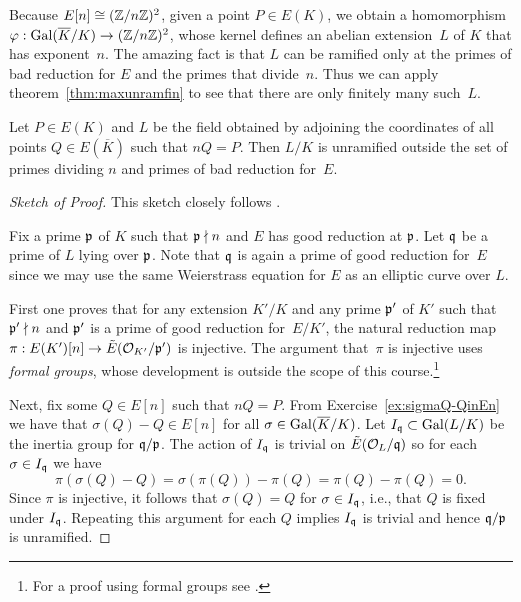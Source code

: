 Because $E[n] \cong (\mathbb{Z}/n\mathbb{Z})^2$, 
given a point $P\in E(K)$, we obtain a homomorphism
$\varphi: \operatorname{Gal}(\overline{K}/K) \to (\mathbb{Z}/n\mathbb{Z})^2$, whose kernel defines an
abelian extension~$L$ of $K$ that has exponent~$n$.
The amazing fact is that $L$ can be ramified only at the primes
of bad reduction for $E$ and the primes that divide~$n$.
Thus we can apply theorem~\ref{thm:maxunramfin} to see that there are
only finitely many such~$L$.

\begin{theorem}\label{thm:mwunram}
  Let $P\in E(K)$ and $L$ be the field obtained by adjoining the
  coordinates of all points $Q \in E(\overline{K})$ such that $nQ = P$.
  Then $L/K$ is unramified outside the set of primes
  dividing $n$ and primes of bad reduction for~$E$.
\end{theorem}
\begin{proof}[Sketch of Proof]
  This sketch closely follows \cite[Prop.~VIII.1.5b]{silverman:aec}.

  Fix a prime $\mathfrak{p}$ of $K$ such that $\mathfrak{p} \nmid n$ and $E$ has good
  reduction at $\mathfrak{p}$. Let $\mathfrak{q}$ be a prime of $L$ lying over $\mathfrak{p}$.
  Note that $\mathfrak{q}$ is again a prime of good reduction for~$E$
  since we may use the same Weierstrass equation for $E$ as an
  elliptic curve over $L$.

  First one proves that for any extension $K'/K$ and any prime $\mathfrak{p}'$ of $K'$
  such that $\mathfrak{p}' \nmid n$ and $\mathfrak{p}'$ is a prime of good reduction for~$E/K'$,
  the natural reduction map $\pi: E(K')[n] \to \tilde{E}(\mathcal{O}_{K'}/\mathfrak{p}')$
  is injective. The argument that~$\pi$ is injective uses
  \emph{formal groups}, whose development is outside the
  scope of this course.\footnote{For a proof using formal groups see
    \cite[Prop.~VII.3.1b]{silverman:aec}.}

  Next, fix some $Q \in E[n]$ such that $nQ = P$.
  From Exercise~\ref{ex:sigmaQ-QinEn} we have that $\sigma(Q)-Q\in E[n]$ for
  all $\sigma \in \operatorname{Gal}(\overline{K}/K)$. Let $I_{\mathfrak{q}}\subset \operatorname{Gal}(L/K)$
  be the inertia group for $\mathfrak{q}/\mathfrak{p}$. The action of $I_{\mathfrak{q}}$ is trivial on
  $\tilde{E}(\mathcal{O}_L/\mathfrak{q})$ so for each $\sigma \in I_{\mathfrak{q}}$ we have
  \[
    \pi(\sigma(Q) - Q) = \sigma(\pi(Q)) - \pi(Q) = \pi(Q) - \pi(Q) = 0.
  \]
  Since $\pi$ is injective, it follows that $\sigma(Q) = Q$ for $\sigma\in I_{\mathfrak{q}}$,
  i.e., that $Q$ is fixed under $I_{\mathfrak{q}}$. Repeating this argument for
  each $Q$ implies $I_{\mathfrak{q}}$ is trivial and hence $\mathfrak{q}/\mathfrak{p}$ is unramified.
\end{proof}

